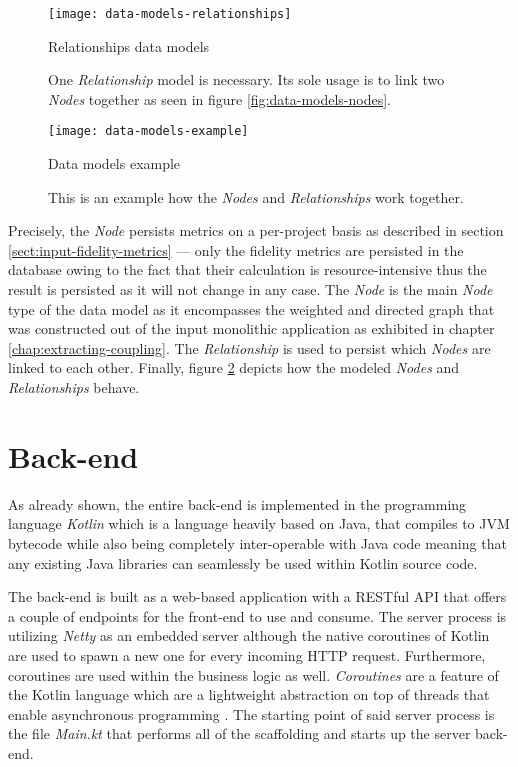 \documentclass[12pt,a4paper]{report}
\begin{document}
\begin{figure}[htbp]
\centering
\texttt{[image: data-models-relationships]}
\caption{Relationships data models}
\caption*{
  One \textit{Relationship} model is necessary. Its sole usage is to link
  two  \textit{Nodes} together as seen in figure \ref{fig:data-models-nodes}.
}
\label{fig:data-models-relationships}
\end{figure}

\begin{figure}[htbp]
\centering
\texttt{[image: data-models-example]}
\caption{Data models example}
\caption*{
  This is an example how the \textit{Nodes} and \textit{Relationships} work together.
}
\label{fig:data-models-example}
\end{figure}

Precisely, the  \textit{Node} persists metrics on a per\hyp project basis
as described in section \ref{sect:input-fidelity-metrics} --- only the fidelity
metrics are persisted in the database owing to the fact that their calculation is
resource\hyp intensive thus the result is persisted as it will not change in any case.
The  \textit{Node} is the main \textit{Node} type of the data model as it
encompasses the weighted and directed graph that was constructed out of the input
monolithic application as exhibited in chapter \ref{chap:extracting-coupling}.
The  \textit{Relationship} is used to persist which
 \textit{Nodes} are linked to each other.
Finally, figure \ref{fig:data-models-example} depicts how the modeled
\textit{Nodes} and \textit{Relationships} behave.



\section{Back-end} \label{sect:implementation-back-end}

As already shown, the entire back-end is implemented in the programming language
\textit{Kotlin} which is a language heavily based on Java, that compiles to JVM
bytecode while also being completely inter-operable with Java code meaning that
any existing Java libraries can seamlessly be used within Kotlin source code.

The back-end is built as a web-based application with a RESTful API that offers
a couple of endpoints for the front-end to use and consume.
The server process is utilizing \textit{Netty} \cite{ktor-netty} as an embedded
server although the native coroutines of Kotlin are used to spawn a new one for
every incoming HTTP request.
Furthermore, coroutines are used within the business logic as well.
\textit{Coroutines} are a feature of the Kotlin language which are a lightweight
abstraction on top of threads that enable asynchronous programming \cite{kotlin-coroutines}.
The starting point of said server process is the file \textit{Main.kt} that
performs all of the scaffolding and starts up the server back-end.
\end{document}
